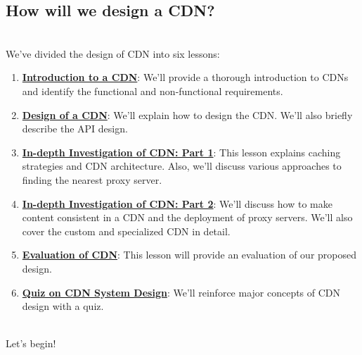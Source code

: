 \subsection{How will we design a CDN?}\label{jYuXRdmFv1MxED915XUYp}
\\
We've divided the design of CDN into six lessons:

\begin{enumerate}
\item
\protect{}\label{-335yulP0aW3neEBXEvSQ}
\href{https://www.educative.io/courses/grokking-the-system-design-interview/introduction-to-a-cdn}{\textbf{Introduction to a CDN}}: We'll provide a thorough introduction to CDNs and identify the functional and non-functional requirements.
\item
\protect{}\label{kn-XQrdzdFCAg85OVQ32q}
\href{https://www.educative.io/courses/grokking-the-system-design-interview/design-of-a-cdn}{\textbf{Design of a CDN}}: We'll explain how to design the CDN. We'll also briefly describe the API design.
\item
\protect{}\label{6mROXyrpTmP6rmXpfUdPo}
\href{https://www.educative.io/courses/grokking-the-system-design-interview/in-depth-investigation-of-cdn-part-1}{\textbf{In-depth Investigation of CDN: Part 1}}: This lesson explains caching strategies and CDN architecture. Also, we'll discuss various approaches to finding the nearest proxy server.
\item
\protect{}\label{ThftFzMZtYtlM8h5Ih_rL}
\href{https://www.educative.io/courses/grokking-the-system-design-interview/in-depth-investigation-of-cdn-part-2}{\textbf{In-depth Investigation of CDN: Part 2}}: We'll discuss how to make content consistent in a CDN and the deployment of proxy servers. We'll also cover the custom and specialized CDN in detail.
\item
\protect{}\label{lkUa_FuYs3w9EWtp6KcYE}
\href{https://www.educative.io/courses/grokking-the-system-design-interview/evaluation-of-cdns-design}{\textbf{Evaluation of CDN}}: This lesson will provide an evaluation of our proposed design.
\item
\protect{}\label{ZaesprjV9IXSYbm-w18q_}
\href{https://www.educative.io/courses/grokking-the-system-design-interview/quiz-on-cdns-design}{\textbf{Quiz on CDN System Design}}: We'll reinforce major concepts of CDN design with a quiz.
\end{enumerate}
\\
Let's begin!

